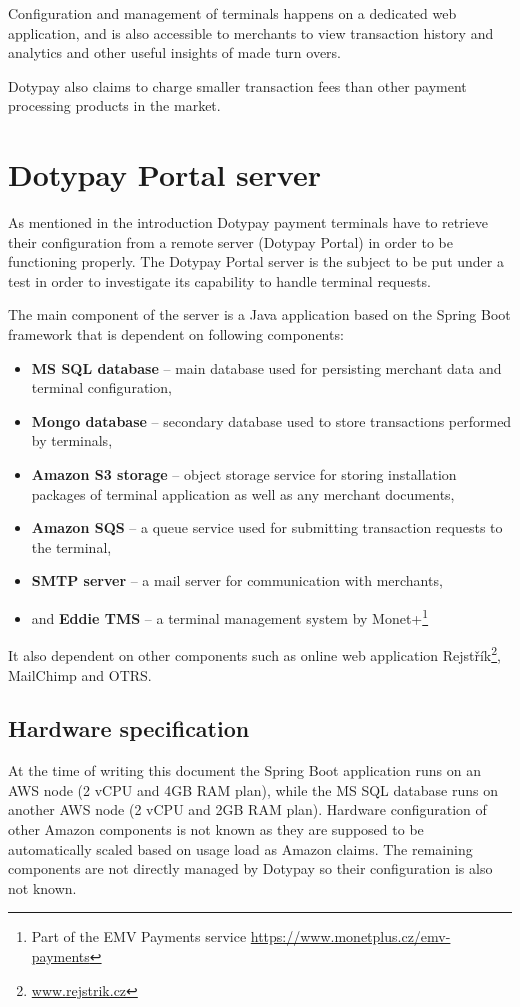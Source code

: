 \documentclass[12pt, a4paper]{article}
\let\oldsection\section
\renewcommand\section{\clearpage\oldsection}
\begin{document}
Configuration and management of terminals happens on a dedicated web application, and is also accessible to merchants to view transaction history and analytics and other useful insights of made turn overs.

Dotypay also claims to charge smaller transaction fees than other payment processing products in the market.


\section{Dotypay Portal server}

As mentioned in the introduction Dotypay payment terminals have to retrieve their configuration from a remote server (Dotypay Portal) in order to be functioning properly. 
The Dotypay Portal server is the subject to be put under a test in order to investigate its capability to handle terminal requests.

The main component of the server is a Java application based on the Spring Boot framework that is dependent on following components:

\begin{itemize}
    \item \textbf{MS SQL database} -- main database used for persisting merchant data and terminal configuration,
    \item \textbf{Mongo database}  -- secondary database used to store transactions performed by terminals,
    \item \textbf{Amazon S3 storage}  -- object storage service for storing installation packages of terminal application as well as any merchant documents,
    \item \textbf{Amazon SQS} -- a queue service used for submitting transaction requests to the terminal,
    \item \textbf{SMTP server} -- a mail server for communication with merchants,
    \item and \textbf{Eddie TMS} -- a terminal management system by Monet+\footnote{Part of the EMV Payments service \url{https://www.monetplus.cz/emv-payments}}
\end{itemize}

It also dependent on other components such as online web application Rejstřík\footnote{\url{www.rejstrik.cz}}, MailChimp and OTRS.

\subsection{Hardware specification}
At the time of writing this document the Spring Boot application runs on an AWS node (2 vCPU and 4GB RAM plan), while the MS SQL database runs on another AWS node (2 vCPU and 2GB RAM plan).
Hardware configuration of other Amazon components is not known as they are supposed to be automatically scaled based on usage load as Amazon claims. The remaining components are not directly managed by Dotypay so their configuration is also not known. 
\end{document}
